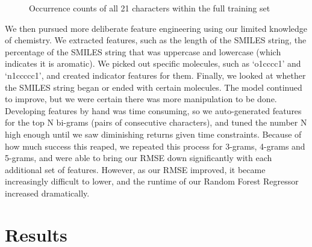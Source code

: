 \documentclass[]{article}
\begin{document}
\begin{flushleft}
\begin{figure}[h]
		\caption{Occurrence counts of all 21 characters within the full training set}
	\end{figure}
	\newline\newline
	We then pursued more deliberate feature engineering using our limited knowledge of chemistry. We extracted features, such as the length of the SMILES string, the percentage of the SMILES string that was uppercase and lowercase (which indicates it is aromatic). We picked out specific molecules, such as ‘o1cccc1’ and ‘n1ccccc1’, and created indicator features for them.  Finally, we looked at whether the SMILES string began or ended with certain molecules. 
	\newline\newline
	The model continued to improve, but we were certain there was more manipulation to be done. Developing features by hand was time consuming, so we auto-generated features for the top N bi-grams (pairs of consecutive characters), and tuned the number N high enough until we saw diminishing returns given time constraints. Because of how much success this reaped, we repeated this process for 3-grams, 4-grams and 5-grams, and were able to bring our RMSE down significantly with each additional set of features.  However, as our RMSE improved, it became increasingly difficult to lower, and the runtime of our Random Forest Regressor increased dramatically.
	\newline\newline
\end{flushleft}
\section{Results}
\end{document}
